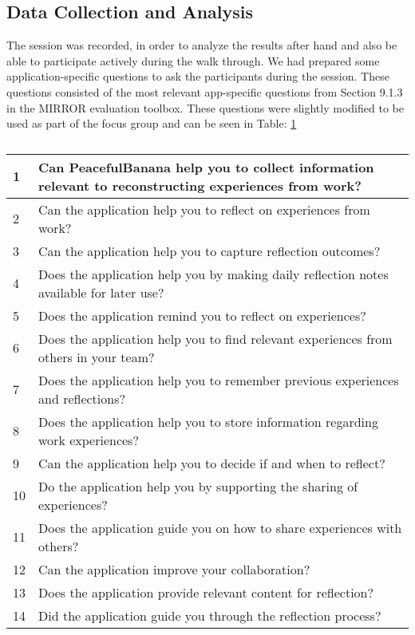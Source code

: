 \subsection{Data Collection and Analysis}
The session was recorded, in order to analyze the results after hand and also be able to participate actively during the walk through. We had prepared some application-specific questions to ask the participants during the session. These questions consisted of the most relevant app-specific questions from Section 9.1.3 in the MIRROR evaluation toolbox\citep{mirrorevaluation}. These questions were slightly modified to be used as part of the focus group and can be seen in Table: \ref{questiontable}
\begin{table}[H]
    \begin{tabularx}{\textwidth}{|l|X|}
    \hline
    1  & Can PeacefulBanana help you to collect information relevant to reconstructing experiences from work? \\ \hline
    2  & Can the application help you to reflect on experiences from work?                                    \\ \hline
    3  & Can the application help you to capture reflection outcomes?                                         \\ \hline
    4  & Does the application help you by making daily reflection notes available for later use?              \\ \hline
    5  & Does the application remind you to reflect on experiences?                                           \\ \hline
    6  & Does the application help you to find relevant experiences from others in your team?                 \\ \hline
    7  & Does the application help you to remember previous experiences and reflections?                      \\ \hline
    8  & Does the application help you to store information regarding work experiences?                       \\ \hline
    9  & Can the application help you to decide if and when to reflect?                                       \\ \hline
    10 & Do the application help you by supporting the sharing of experiences?                                \\ \hline
    11 & Does the application guide you on how to share experiences with others?                              \\ \hline
    12 & Can the application improve your collaboration?                                                      \\ \hline
    13 & Does the application provide relevant content for reflection?                                        \\ \hline
    14 & Did the application guide you through the reflection process?                                        \\ \hline
    \end{tabularx}
    \caption{}
    \label{questiontable}
\end{table}

